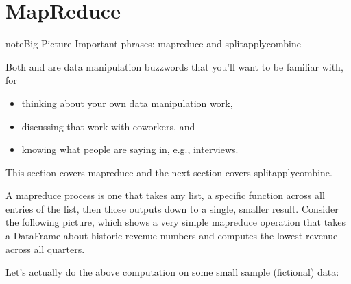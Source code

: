 \documentclass[letterpaper,10pt,english]{sphinxmanual}
\begin{document}
\section{Map\sphinxhyphen{}Reduce}
\label{\detokenize{chapter-11-processing-rows:map-reduce}}
\begin{sphinxadmonition}{note}{Big Picture \sphinxhyphen{} Important phrases: map\sphinxhyphen{}reduce and split\sphinxhyphen{}apply\sphinxhyphen{}combine}

Both  and  are data manipulation buzzwords that you’ll want to be familiar with, for
\begin{itemize}
\item {} 
thinking about your own data manipulation work,

\item {} 
discussing that work with coworkers, and

\item {} 
knowing what people are saying in, e.g., interviews.

\end{itemize}

This section covers map\sphinxhyphen{}reduce and the next section covers split\sphinxhyphen{}apply\sphinxhyphen{}combine.
\end{sphinxadmonition}

A map\sphinxhyphen{}reduce process is one that takes any list,  a specific function across all entries of the list, then  those outputs down to a single, smaller result.  Consider the following picture, which shows a very simple map\sphinxhyphen{}reduce operation that takes a DataFrame about historic revenue numbers and computes the lowest revenue across all quarters.


Let’s actually do the above computation on some small sample (fictional) data:
\end{document}
